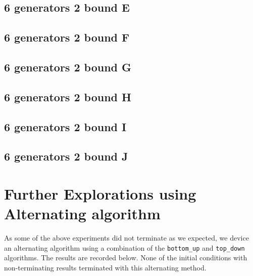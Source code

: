 \documentclass{TC}
\begin{document}
{\subsection{6 generators 2 bound E}
\label{fail8} %

\newpage

\subsection{6 generators 2 bound F}
\label{fail9} %

\newpage

\subsection{6 generators 2 bound G}
\label{fail10} %

\newpage

\subsection{6 generators 2 bound H}

\newpage

\subsection{6 generators 2 bound I}
\label{fail11} %

\newpage

\subsection{6 generators 2 bound J}

\newpage
}
\section{Further Explorations using Alternating algorithm}
As some of the above experiments did not terminate as we expected, we device an alternating algorithm using a combination of the \texttt{bottom\_up} and \texttt{top\_down} algorithms. The results are recorded below. None of the initial conditions with non-terminating results terminated with this alternating method.
\end{document}

